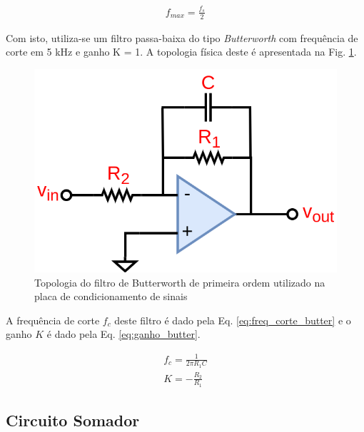	\begin{align}
		f_{max} = \frac{f_s}{2}\label{eq:freq_sinal}
	\end{align}

	Com isto, utiliza-se um filtro passa-baixa do tipo \textit{Butterworth} com frequência de corte em 5 kHz e ganho K = 1. A topologia física deste é apresentada na Fig. \ref{fig:filtro-butter}.
	
\begin{figure}[!hbt]
         \begin{center}
         \includegraphics[scale=0.25]{figuras/Filtro_butter.png}
         \caption{Topologia do filtro de Butterworth de primeira ordem utilizado na placa de condicionamento de sinais}
         \label{fig:filtro-butter}
         \end{center}
 \end{figure}

	A frequência de corte $f_c$ deste filtro é dado pela Eq. \ref{eq:freq_corte_butter} e o ganho $K$ é dado pela Eq. \ref{eq:ganho_butter}.
	
\begin{align}
	f_{c} = \frac{1}{2\pi R_1 C} \label{eq:freq_corte_butter} \\
	K = -\frac{R_2}{R_1}\label{eq:ganho_butter}
\end{align}

\subsection{Circuito Somador}

